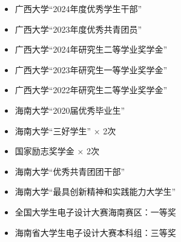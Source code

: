 \documentclass[10pt,a4paper,ragged2e,withhyper]{altacv}
\begin{document}
\begin{paracol}{2}
\medskip




\switchcolumn


\vspace{-0.0mm}

\begin{itemize}
	\item {\fontsize{9}{11} \selectfont 广西大学“2024年度优秀学生干部”}
	\item {\fontsize{9}{11} \selectfont 广西大学“2023年度优秀共青团员”}
	\item {\fontsize{9}{11} \selectfont 广西大学“2024年研究生二等学业奖学金”}
	\item {\fontsize{9}{11} \selectfont 广西大学“2023年研究生一等学业奖学金”}
	\item {\fontsize{9}{11} \selectfont 广西大学“2022年研究生二等学业奖学金”}
\end{itemize}
\divider
\begin{itemize}
	\item {\fontsize{9}{11} \selectfont 海南大学“2020届优秀毕业生”}
	\item {\fontsize{9}{11} \selectfont 海南大学“三好学生” × 2次}
	\item {\fontsize{9}{11} \selectfont 国家励志奖学金 × 2次}
	\item {\fontsize{9}{11} \selectfont 海南大学“优秀共青团团干部”}
	\item {\fontsize{9}{11} \selectfont 海南大学“最具创新精神和实践能力大学生”}
	\item {\fontsize{9}{11} \selectfont 全国大学生电子设计大赛海南赛区：一等奖}
	\item {\fontsize{9}{11} \selectfont 海南省大学生电子设计大赛本科组：三等奖}
\end{itemize}


\\





\\
\\
\\
\\
\\



\end{paracol}
\end{document}
